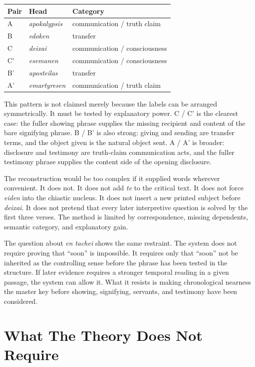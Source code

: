 \begin{center}
\begin{longtable}{@{}p{}p{}p{}@{}}
\toprule
Pair & Head & Category \\
\midrule
A & \textit{apokalypsis} & communication / truth claim \\
B & \textit{edoken} & transfer \\
C & \textit{deixai} & communication / consciousness \\
C' & \textit{esemanen} & communication / consciousness \\
B' & \textit{aposteilas} & transfer \\
A' & \textit{emartyresen} & communication / truth claim \\
\bottomrule
\end{longtable}
\end{center}

This pattern is not claimed merely because the labels can be arranged symmetrically. It must be tested by explanatory power. C / C' is the clearest case: the fuller showing phrase supplies the missing recipient and content of the bare signifying phrase. B / B' is also strong: giving and sending are transfer terms, and the object given is the natural object sent. A / A' is broader: disclosure and testimony are truth-claim communication acts, and the fuller testimony phrase supplies the content side of the opening disclosure.

The reconstruction would be too complex if it supplied words wherever convenient. It does not. It does not add \textit{te} to the critical text. It does not force \textit{eiden} into the chiastic nucleus. It does not insert a new printed subject before \textit{deixai}. It does not pretend that every later interpretive question is solved by the first three verses. The method is limited by correspondence, missing dependents, semantic category, and explanatory gain.

The question about \textit{en tachei} shows the same restraint. The system does not require proving that ``soon'' is impossible. It requires only that ``soon'' not be inherited as the controlling sense before the phrase has been tested in the structure. If later evidence requires a stronger temporal reading in a given passage, the system can allow it. What it resists is making chronological nearness the master key before showing, signifying, servants, and testimony have been considered.

\section{What The Theory Does Not Require}

